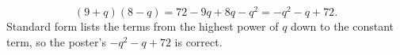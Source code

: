 \[(9+q)(8-q)=72-9q+8q-q^2=\boxed{-q^2-q+72}.\]
Standard form lists the terms from the highest power of $q$ down to the constant term, so the poster's $-q^2-q+72$ is correct.
